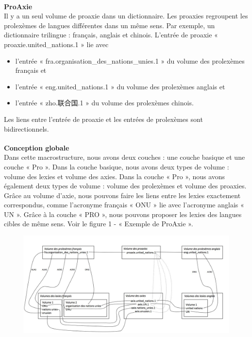 \documentclass[10pt,a4paper,twoside]{article}
\begin{document}
\quad  \\
\textbf{ProAxie}\\
Il y a un seul volume de proaxie dans un dictionnaire. Les proaxies regroupent les prolexèmes de langues différentes dans un même sens. Par exemple, un dictionnaire trilingue : français, anglais et chinois. L’entrée de proaxie « proaxie.united\_nations.1 » lie avec 
\begin{itemize}
\begin{itemize}
\item l’entrée « fra.organisation\_des\_nations\_unies.1 » du volume des prolexèmes français et 
\item l’entrée « eng.united\_nations.1 » du volume des prolexèmes anglais et
\item l’entrée « zho.联合国.1 » du volume des prolexèmes chinois.
\end{itemize}
Les liens entre l'entrée de proaxie et les entrées de prolexèmes sont bidirectionnels.\\
\\
\textbf{Conception globale}\\
Dans cette macrostructure, nous avons deux couches : une couche basique et une couche « Pro ».  Dans la couche basique, nous avons deux types de volume : volume des lexies et volume des axies. Dans la couche « Pro », nous avons également deux types de volume : volume des prolexèmes et volume des proaxies.
Grâce au volume d’axie, nous pouvons faire les liens entre les lexies exactement correspondus, comme l’acronyme français « ONU » lie avec l’acronyme anglais « UN ». Grâce à la couche « PRO »,  nous pouvons proposer les lexies des langues cibles de même sens.  Voir le figure 1 - « Exemple de ProAxie ».\\
\begin{figure}[htbp] 
\begin{center} 
\includegraphics[width=14cm]{images/proaxie_2-etages.jpg}

\end{center}
\end{figure}
\end{itemize}
\end{document}
